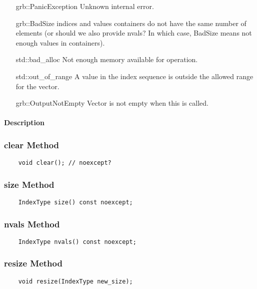 \begin{itemize}[leftmargin=2.1in]
    \item[{\sf grb::PanicException}]   Unknown internal error.
    \item[{\sf grb::BadSize}]          indices and values containers do not have
                                       the same number of elements (or should we 
                                       also provide nvals? In which case, BadSize 
                                       means not enough values in containers).
    \item[{\sf std::bad\_alloc}]       Not enough memory available for operation.
    \item[{\sf std::out\_of\_range}]   A value in the index sequence is outside the
                                       allowed range for the vector.
    \item[{\sf grb::OutputNotEmpty}]   Vector is not empty when this is called.                                  
\end{itemize}

\paragraph{Description}

\subsubsection{{\sf clear} Method}
\begin{verbatim}
    void clear(); // noexcept?
\end{verbatim}

\subsubsection{{\sf size} Method}
\begin{verbatim}
    IndexType size() const noexcept;
\end{verbatim}

\subsubsection{{\sf nvals} Method}
\begin{verbatim}
    IndexType nvals() const noexcept;
\end{verbatim}

\subsubsection{{\sf resize} Method}
\begin{verbatim}
    void resize(IndexType new_size);
\end{verbatim}


